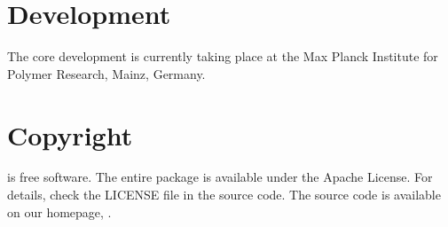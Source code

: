 \section*{Development}
The core development is currently taking place at the Max Planck Institute for Polymer Research, Mainz, Germany.

\section*{Copyright}
\votcact is free software. The entire package is available under the Apache License. For details, check
the LICENSE file in the source code. The \votcact source code is available on our homepage, .

\vfill